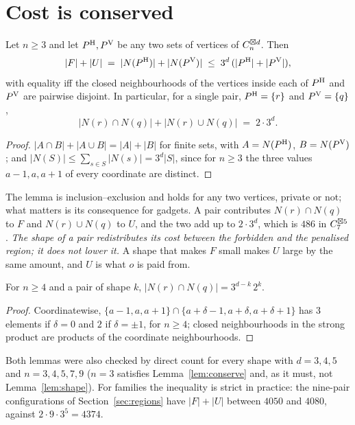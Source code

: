 \section{Cost is conserved}
\label{sec:cost}

\begin{lemma}[proved]
\label{lem:conserve}
Let $n\ge3$ and let $P^{\mathrm H},P^{\mathrm V}$ be any two sets of vertices of $C_n^{\boxtimes d}$. Then
\[
  |F|+|U| \;=\; |N(P^{\mathrm H})|+|N(P^{\mathrm V})| \;\le\; 3^d\,(|P^{\mathrm H}|+|P^{\mathrm V}|),
\]
with equality iff the closed neighbourhoods of the vertices inside each of $P^{\mathrm H}$ and $P^{\mathrm V}$ are
pairwise disjoint. In particular, for a single pair, $P^{\mathrm H}=\{r\}$ and $P^{\mathrm V}=\{q\}$,
\[
  |N(r)\cap N(q)|+|N(r)\cup N(q)| \;=\; 2\cdot 3^d .
\]
\end{lemma}

\begin{proof}
$|A\cap B|+|A\cup B|=|A|+|B|$ for finite sets, with $A=N(P^{\mathrm H})$, $B=N(P^{\mathrm V})$; and
$|N(S)|\le\sum_{s\in S}|N(s)|=3^d|S|$, since for $n\ge3$ the three values $a-1,a,a+1$ of every
coordinate are distinct.
\end{proof}

The lemma is inclusion--exclusion and holds for any two vertices, private or not; what matters is
its consequence for gadgets. A pair contributes $N(r)\cap N(q)$ to $F$ and $N(r)\cup N(q)$ to $U$,
and the two add up to $2\cdot 3^d$, which is $486$ in $C_7^{\boxtimes 5}$. \emph{The shape of a pair
redistributes its cost between the forbidden and the penalised region; it does not lower it.} A
shape that makes $F$ small makes $U$ large by the same amount, and $U$ is what $o$ is paid from.

\begin{lemma}[proved]
\label{lem:shape}
For $n\ge4$ and a pair of shape $k$, $|N(r)\cap N(q)|=3^{d-k}\,2^{k}$.
\end{lemma}

\begin{proof}
Coordinatewise, $\{a-1,a,a+1\}\cap\{a+\delta-1,a+\delta,a+\delta+1\}$ has $3$ elements if
$\delta=0$ and $2$ if $\delta=\pm1$, for $n\ge4$; closed neighbourhoods in the strong product are
products of the coordinate neighbourhoods.
\end{proof}

Both lemmas were also checked by direct count for every shape with $d=3,4,5$ and $n=3,4,5,7,9$
($n=3$ satisfies Lemma~\ref{lem:conserve} and, as it must, not Lemma~\ref{lem:shape}). For
families the inequality is strict in practice: the nine-pair configurations of
Section~\ref{sec:regions} have $|F|+|U|$ between $4050$ and $4080$, against
$2\cdot9\cdot3^5=4374$.

